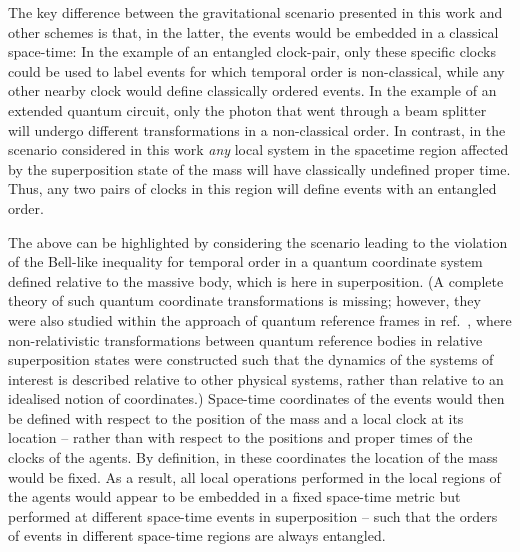 \documentclass[a4paper,11pt]{article}
\begin{document}
The key difference between the gravitational scenario presented in this work and other schemes is that, in the latter, the events would be embedded in a classical space-time: In the example of an entangled clock-pair, only these specific clocks could be used to label events for which temporal order is non-classical, while any other nearby clock would define classically ordered events. In the example of an extended quantum circuit, only the photon that went through a beam splitter will undergo different transformations in a non-classical order. In contrast, in the scenario considered in this work \textit{any} local system in the spacetime region affected by the superposition state of the mass will have classically undefined proper time. Thus, any two pairs of clocks in this region will define events with an entangled order.

The above can be highlighted by considering the scenario leading to the violation of the Bell-like inequality for temporal order in a quantum coordinate system \cite{zych2018relativity} defined relative to the massive body, which is here in superposition. (A complete theory of such quantum coordinate transformations is missing; however,  they were also studied within the approach of quantum reference frames in ref.~\cite{Giacomini:2017qcovariance}, where non-relativistic transformations between quantum reference bodies in relative superposition states were constructed such that the dynamics of the systems of interest is described relative to other physical systems, rather than relative to an idealised notion of coordinates.)
 Space-time coordinates of the events would then be defined with respect to the position of the mass and a local clock at its location --  %
rather than with respect to the positions and proper times of the clocks of the agents.  By definition, in these coordinates the location of the mass would be fixed. As a result, all local operations performed in the local regions of the agents would appear {to be embedded in a fixed space-time metric} but performed at {different} space-time {events} in superposition -- such that the orders of events in different space-time regions are always entangled. 
\end{document}
